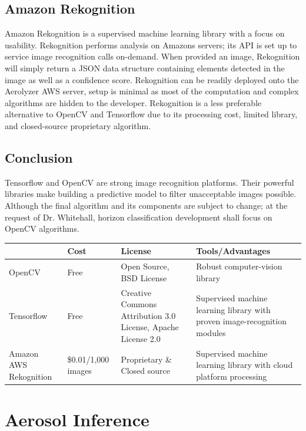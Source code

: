 \documentclass[onecolumn, draftclsnofoot,10pt, compsoc]{IEEEtran}
\begin{document}
\begin{singlespace}
	\subsection{Amazon Rekognition}
		Amazon Rekognition is a supervised machine learning library with a focus on usability.
		Rekognition performs analysis on Amazons servers; its API is set up to service image recognition calls on-demand.
		When provided an image, Rekognition will simply return a JSON data structure containing elements detected in the image as well as a confidence score.
		Rekognition can be readily deployed onto the Aerolyzer AWS server, setup is minimal as most of the computation and complex algorithms are hidden to the developer.
		Rekognition is a less preferable alternative to OpenCV and Tensorflow due to its processing cost, limited library, and closed-source proprietary algorithm.	\cite{amazon}

	\subsection{Conclusion}
		Tensorflow and OpenCV are strong image recognition platforms.
		Their powerful libraries make building a predictive model to filter unacceptable images possible.
		Although the final algorithm and its components are subject to change; at the request of Dr.
		Whitehall, horizon classification development shall focus on OpenCV algorithms.
		\begin{center}
			\begin{tabular}{|l|p{3cm}|p{4cm}|p{5cm}|}
				\hline \textbf{} & \textbf{Cost} & \textbf{License} & \textbf{Tools/Advantages} \\\hline
				OpenCV & Free & Open Source, BSD License & Robust computer-vision library\\\hline
				Tensorflow & Free & Creative Commons Attribution 3.0 License, Apache License 2.0 & Supervised machine learning library with proven image-recognition modules\\\hline
				Amazon AWS Rekognition & \$0.01/1,000 images & Proprietary \& Closed source& Supervised machine learning library with cloud platform processing\\\hline
			\end{tabular}
		\end{center}

\section{Aerosol Inference}

\end{singlespace}
\end{document}
